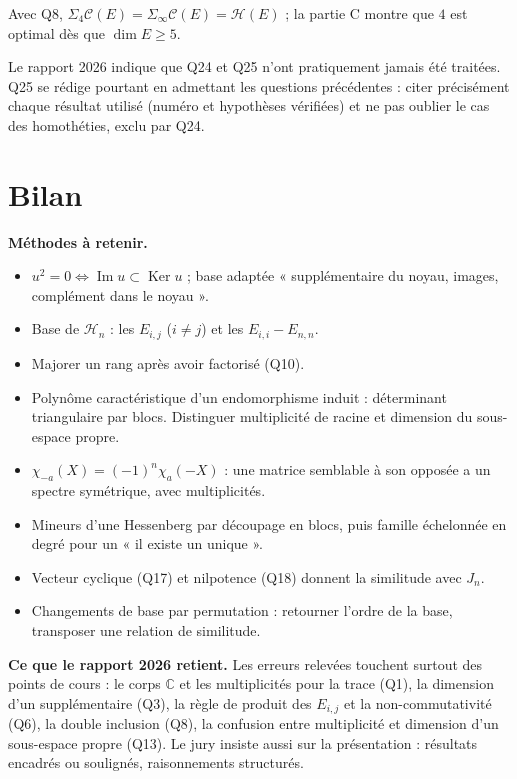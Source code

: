 \documentclass[11pt,a4paper]{article}
\providecommand{\tightlist}{\setlength{\itemsep}{0pt}\setlength{\parskip}{0pt}}
\begin{document}
Avec Q8, \(\Sigma_4\mathcal C(E)=\Sigma_\infty\mathcal C(E)=\mathcal H(E)\) ; la partie C montre que \(4\) est optimal dès que \(\dim E\geqslant5\).

\begin{jury}

Le rapport 2026 indique que Q24 et Q25 n'ont pratiquement jamais été traitées. Q25 se rédige pourtant en admettant les questions précédentes : citer précisément chaque résultat utilisé (numéro et hypothèses vérifiées) et ne pas oublier le cas des homothéties, exclu par Q24.

\end{jury}

\hypertarget{bilan}{%
\section{Bilan}\label{bilan}}

\textbf{Méthodes à retenir.}

\begin{itemize}
\tightlist
\item
  \(u^2=0\iff\operatorname{Im}u\subset\operatorname{Ker}u\) ; base adaptée « supplémentaire du noyau, images, complément dans le noyau ».
\item
  Base de \(\mathcal H_n\) : les \(E_{i,j}\) (\(i\neq j\)) et les \(E_{i,i}-E_{n,n}\).
\item
  Majorer un rang après avoir factorisé (Q10).
\item
  Polynôme caractéristique d'un endomorphisme induit : déterminant triangulaire par blocs. Distinguer multiplicité de racine et dimension du sous-espace propre.
\item
  \(\chi_{-a}(X)=(-1)^n\chi_a(-X)\) : une matrice semblable à son opposée a un spectre symétrique, avec multiplicités.
\item
  Mineurs d'une Hessenberg par découpage en blocs, puis famille échelonnée en degré pour un « il existe un unique ».
\item
  Vecteur cyclique (Q17) et nilpotence (Q18) donnent la similitude avec \(J_n\).
\item
  Changements de base par permutation : retourner l'ordre de la base, transposer une relation de similitude.
\end{itemize}

\textbf{Ce que le rapport 2026 retient.} Les erreurs relevées touchent surtout des points de cours : le corps \(\mathbb C\) et les multiplicités pour la trace (Q1), la dimension d'un supplémentaire (Q3), la règle de produit des \(E_{i,j}\) et la non-commutativité (Q6), la double inclusion (Q8), la confusion entre multiplicité et dimension d'un sous-espace propre (Q13). Le jury insiste aussi sur la présentation : résultats encadrés ou soulignés, raisonnements structurés.
\end{document}
